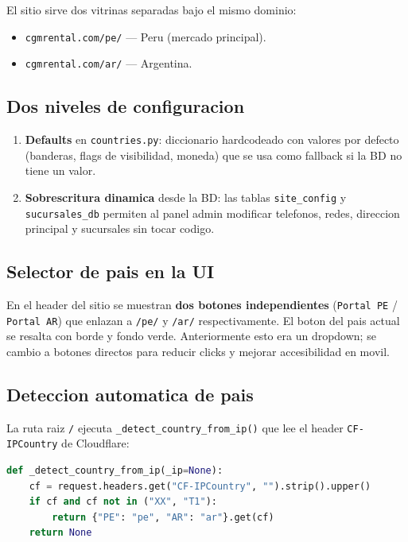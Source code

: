 \documentclass[11pt,a4paper]{article}
\begin{document}
El sitio sirve dos vitrinas separadas bajo el mismo dominio:

\begin{itemize}[leftmargin=*]
    \item \texttt{cgmrental.com/pe/} --- Peru (mercado principal).
    \item \texttt{cgmrental.com/ar/} --- Argentina.
\end{itemize}

\subsection{Dos niveles de configuracion}

\begin{enumerate}[leftmargin=*]
    \item \textbf{Defaults} en \texttt{countries.py}: diccionario hardcodeado
        con valores por defecto (banderas, flags de visibilidad, moneda) que
        se usa como fallback si la BD no tiene un valor.
    \item \textbf{Sobrescritura dinamica} desde la BD: las tablas
        \texttt{site\_config} y \texttt{sucursales\_db} permiten al panel
        admin modificar telefonos, redes, direccion principal y sucursales
        sin tocar codigo.
\end{enumerate}

\subsection{Selector de pais en la UI}

En el header del sitio se muestran \textbf{dos botones independientes}
(\texttt{Portal PE} / \texttt{Portal AR}) que enlazan a \texttt{/pe/} y
\texttt{/ar/} respectivamente. El boton del pais actual se resalta con borde
y fondo verde. Anteriormente esto era un dropdown; se cambio a botones
directos para reducir clicks y mejorar accesibilidad en movil.

\subsection{Deteccion automatica de pais}

La ruta raiz \texttt{/} ejecuta \texttt{\_detect\_country\_from\_ip()} que
lee el header \texttt{CF-IPCountry} de Cloudflare:

\begin{lstlisting}[language=Python]
def _detect_country_from_ip(_ip=None):
    cf = request.headers.get("CF-IPCountry", "").strip().upper()
    if cf and cf not in ("XX", "T1"):
        return {"PE": "pe", "AR": "ar"}.get(cf)
    return None
\end{lstlisting}
\end{document}
